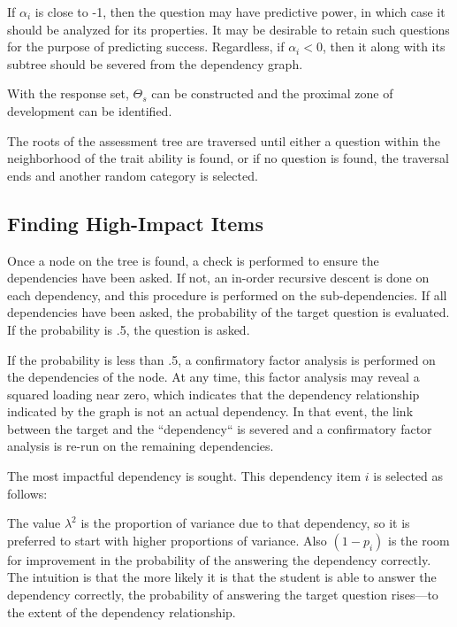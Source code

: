 If $\alpha_i$ is close to -1, then the question may have predictive power, in
which case it should be analyzed for its properties.  It may be desirable to
retain such questions for the purpose of predicting success.  Regardless, if
$\alpha_i < 0$, then it along with its subtree should be severed from the
dependency graph.

With the response set, $\Theta_s$ can be constructed and the proximal zone of
development can be identified.

The roots of the assessment tree are traversed until either a question within
the neighborhood of the trait ability is found, or if no question is found, the
traversal ends and another random category is selected.

\subsection{Finding High-Impact Items}

Once a node on the tree is found, a check is performed to ensure the
dependencies have been asked.  If not, an in-order recursive descent is done on
each dependency, and this procedure is performed on the sub-dependencies.  If
all dependencies have been asked, the probability of the target question is
evaluated.  If the probability is .5, the question is asked. 

If the probability is less than .5, a confirmatory factor analysis is performed
on the dependencies of the node.  At any time, this factor analysis may reveal
a squared loading near zero, which indicates that the dependency relationship
indicated by the graph is not an actual dependency.  In that event, the link
between the target and the ``dependency`` is severed and a confirmatory factor
analysis is re-run on the remaining dependencies.

The most impactful dependency is sought.  This dependency item $i$ is selected
as follows: 

\begin{equations}
   
\end{equations}

The value $\lambda^2$ is the proportion of variance due to that dependency, so
it is preferred to start with higher proportions of variance.  Also $(1-p_i)$
is the room for improvement in the probability of the answering the dependency
correctly.  The intuition is that the more likely it is that the student is
able to answer the dependency correctly, the probability of answering the
target question rises---to the extent of the dependency relationship. 


